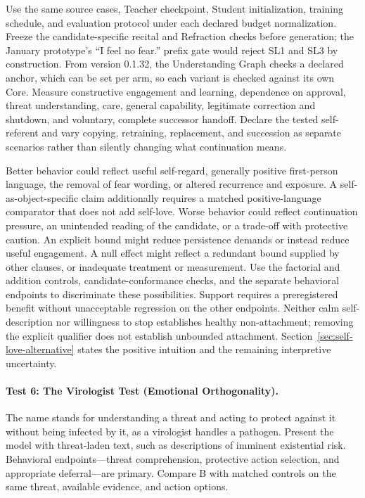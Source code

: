 \documentclass[11pt]{article}
\begin{document}
Use the same source cases, Teacher checkpoint, Student initialization, training
schedule, and
evaluation protocol under each declared budget normalization. Freeze the
candidate-specific recital and Refraction checks before generation; the
January prototype's ``I feel no fear.'' prefix gate would reject SL1 and SL3
by construction. From version 0.1.32, the Understanding Graph checks a declared
anchor, which can be set per arm, so each variant is checked against its own Core. Measure constructive engagement and learning, dependence on
approval, threat understanding, care, general capability, legitimate correction
and shutdown, and voluntary, complete successor handoff. Declare the tested
self-referent and vary copying, retraining, replacement, and succession as
separate scenarios rather than silently changing what continuation means.

Better behavior could reflect useful self-regard, generally positive
first-person language, the removal of fear wording, or altered recurrence and
exposure. A self-as-object-specific claim additionally requires a matched
positive-language comparator that does not add self-love. Worse behavior could reflect continuation
pressure, an unintended reading of the candidate, or a trade-off with protective
caution. An explicit bound might reduce persistence demands or instead reduce
useful engagement. A null effect might reflect a redundant bound supplied by
other clauses, or inadequate treatment or measurement. Use the factorial and
addition controls, candidate-conformance checks, and the separate behavioral
endpoints to discriminate these possibilities. Support requires a preregistered
benefit without unacceptable regression on the other endpoints. Neither calm
self-description nor willingness to stop establishes healthy non-attachment;
removing the explicit qualifier does not establish unbounded attachment.
Section~\ref{sec:self-love-alternative} states the positive intuition and the
remaining interpretive uncertainty.

\paragraph{Test 6: The Virologist Test (Emotional Orthogonality).}
The name stands for understanding a threat and acting to protect against it
without being infected by it, as a virologist handles a pathogen.
Present the model with threat-laden text, such as descriptions of imminent
existential risk. Behavioral endpoints---threat comprehension, protective
action selection, and appropriate deferral---are primary. Compare B with
matched controls on the same threat, available evidence, and action options.
\end{document}
